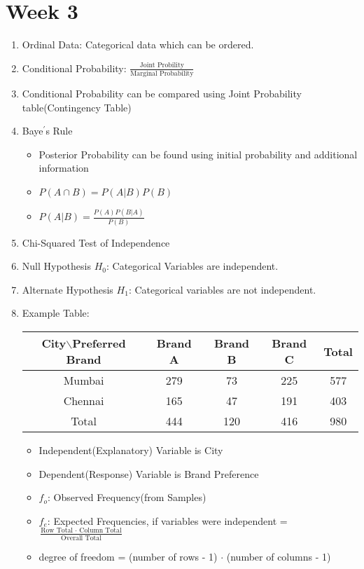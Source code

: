 \documentclass[a4paper]{article}
\begin{document}
\section{Week 3}
	\begin{enumerate}
		\item Ordinal Data: Categorical data which can be ordered.
		\item Conditional Probability: $\frac{\text{Joint Probility}}{\text{Marginal Probability}}$
		\item Conditional Probability can be compared using Joint Probability table(Contingency Table)
		\item Baye$^{'}$s Rule
		\begin{itemize}
			\item Posterior Probability can be found using initial probability and additional information
			\item $P(A\cap B) = P(A|B)P(B)$
			\item $P(A|B) = \frac{P(A)P(B|A)}{P(B)}$
		\end{itemize}
		\item Chi-Squared Test of Independence
		\item Null Hypothesis $H_0$: Categorical Variables are independent.
		\item Alternate Hypothesis $H_1$: Categorical variables are not independent.
		\item Example Table:
		
		\begin{tabular}{|c||c|c|c||c|}
			\hline
			City$\backslash$Preferred Brand& Brand A& Brand B& Brand C& Total\\
			\hline \hline
			Mumbai& 279& 73& 225& 577\\
			\hline
			Chennai& 165& 47& 191& 403\\
			\hline \hline
			Total& 444& 120& 416& 980\\
			\hline
		\end{tabular}
		\begin{itemize}
			\item Independent(Explanatory) Variable is City
			\item Dependent(Response) Variable is Brand Preference
			\item $f_{o}$: Observed Frequency(from Samples)
			\item $f_{e}$: Expected Frequencies, if variables were independent = $\frac{\text{Row Total $\cdot$ Column Total}}{\text{Overall Total}}$
			\item degree of freedom = (number of rows - 1) $\cdot$ (number of columns - 1)
		\end{itemize}
	\end{enumerate}
\end{document}
